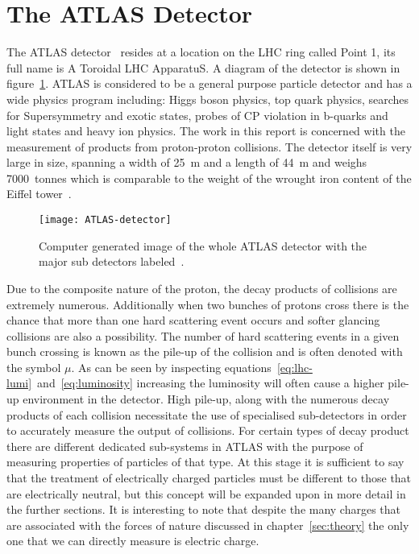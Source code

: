 \section{The ATLAS Detector}%
\label{sec:atlas}

The ATLAS detector~\cite{ATLAS} resides at a location on the LHC ring called
Point 1, its full name is A Toroidal LHC ApparatuS. A diagram of the detector is
shown in figure~\ref{fig:ATLAS-det}. ATLAS is considered to be a general purpose
particle detector and has a wide physics program including: Higgs boson physics,
top quark physics, searches for Supersymmetry and exotic states, probes of CP
violation in b-quarks and light states and heavy ion physics. The work in this
report is concerned with the measurement of products from proton-proton
collisions. The detector itself is very large in size, spanning a width of 25~m
and a length of 44~m and weighs 7000~tonnes which is comparable to the weight of
the wrought iron content of the Eiffel tower~\cite{Eiffel-weight}.
\begin{figure}[h]
  \centering
  \texttt{[image: ATLAS-detector]}
  \caption[The ATLAS Detector]{Computer generated image of the whole ATLAS
    detector with the major sub detectors labeled~\cite{ATLAS-det-fig}.}%
  \label{fig:ATLAS-det}
\end{figure}


Due to the composite nature of the proton, the decay products of collisions are
extremely numerous. Additionally when two bunches of protons cross there is the
chance that more than one hard scattering event occurs and softer glancing
collisions are also a possibility. The number of hard scattering events in a
given bunch crossing is known as the pile-up of the collision and is often
denoted with the symbol $\mu$. As can be seen by inspecting
equations~\ref{eq:lhc-lumi}~and~\ref{eq:luminosity} increasing the luminosity
will often cause a higher pile-up environment in the detector. High pile-up,
along with the numerous decay products of each collision necessitate the use of
specialised sub-detectors in order to accurately measure the output of
collisions. For certain types of decay product there are different dedicated
sub-systems in ATLAS with the purpose of measuring properties of particles of
that type. At this stage it is sufficient to say that the treatment of
electrically charged particles must be different to those that are electrically
neutral, but this concept will be expanded upon in more detail in the further
sections. It is interesting to note that despite the many charges that are
associated with the forces of nature discussed in chapter~\ref{sec:theory} the
only one that we can directly measure is electric charge.%

